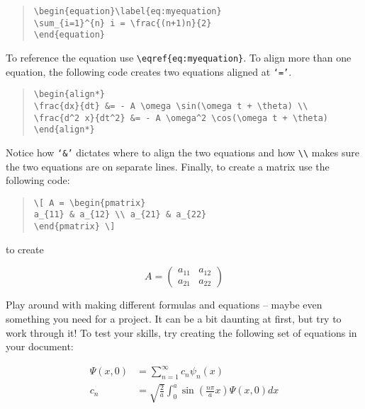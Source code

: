 \documentclass[a4paper,oneside]{memoir}
\begin{document}
\begin{quote}
\begin{lstlisting}
\begin{equation}\label{eq:myequation}
\sum_{i=1}^{n} i = \frac{(n+1)n}{2}
\end{equation}
\end{lstlisting}
\end{quote}

To reference the equation use \lstinline$\eqref{eq:myequation}$. To align more than one equation, the following code creates two equations aligned at \texttt{`='}.

\begin{quote}
\begin{lstlisting}
\begin{align*}
\frac{dx}{dt} &= - A \omega \sin(\omega t + \theta) \\
\frac{d^2 x}{dt^2} &= - A \omega^2 \cos(\omega t + \theta)
\end{align*}
\end{lstlisting}
\end{quote}

Notice how \texttt{`\&'} dictates where to align the two equations and how \lstinline$\\$ makes sure the two equations are on separate lines. Finally, to create a matrix use the following code:

\begin{quote}
\begin{lstlisting}
\[ A = \begin{pmatrix}
a_{11} & a_{12} \\ a_{21} & a_{22}
\end{pmatrix} \]
\end{lstlisting}
\end{quote}

to create

\[ A = \begin{pmatrix}
a_{11} & a_{12} \\ a_{21} & a_{22}
\end{pmatrix} \]

Play around with making different formulas and equations -- maybe even something you need for a project. It can be a bit daunting at first, but try to work through it! To test your skills, try creating the following set of equations in your document:

\begin{align*}
\Psi(x, 0) &= \sum_{n=1}^{\infty} c_n \psi_n (x) \\
c_n &= \sqrt{\frac{2}{a}} \int_0^a \sin \left( \frac{n\pi}{a} x \right) \Psi(x, 0) dx
\end{align*}
\end{document}
